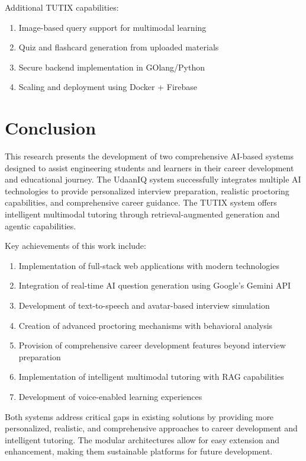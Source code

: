 \documentclass[12pt, conference]{IEEEtran}
\begin{document}
Additional TUTIX capabilities:
\begin{enumerate}
    \item Image-based query support for multimodal learning
    \item Quiz and flashcard generation from uploaded materials
    \item Secure backend implementation in GOlang/Python
    \item Scaling and deployment using Docker + Firebase
\end{enumerate}

\section{Conclusion}

This research presents the development of two comprehensive AI-based systems designed to assist engineering students and learners in their career development and educational journey. The UdaanIQ system successfully integrates multiple AI technologies to provide personalized interview preparation, realistic proctoring capabilities, and comprehensive career guidance. The TUTIX system offers intelligent multimodal tutoring through retrieval-augmented generation and agentic capabilities.

Key achievements of this work include:
\begin{enumerate}
    \item Implementation of full-stack web applications with modern technologies
    \item Integration of real-time AI question generation using Google's Gemini API
    \item Development of text-to-speech and avatar-based interview simulation
    \item Creation of advanced proctoring mechanisms with behavioral analysis
    \item Provision of comprehensive career development features beyond interview preparation
    \item Implementation of intelligent multimodal tutoring with RAG capabilities
    \item Development of voice-enabled learning experiences
\end{enumerate}

Both systems address critical gaps in existing solutions by providing more personalized, realistic, and comprehensive approaches to career development and intelligent tutoring. The modular architectures allow for easy extension and enhancement, making them sustainable platforms for future development.
\end{document}
